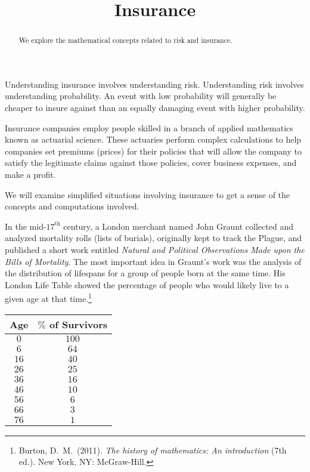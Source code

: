 \documentclass{ximera}
\title{Insurance}
\begin{document}
\begin{abstract}
We explore the mathematical concepts related to risk and insurance.
\end{abstract}

\maketitle

Understanding insurance involves understanding risk. Understanding risk involves understanding probability. An event with low probability will generally be cheaper to insure against than an equally damaging event with higher probability.

Insurance companies employ people skilled in a branch of applied mathematics known as actuarial science. These actuaries perform complex calculations to help companies set premiums (prices) for their policies that will allow the company to satisfy the legitimate claims against those policies, cover business expenses, and make a profit.

We will examine simplified situations involving insurance to get a sense of the concepts and computations involved.

In the mid-$17^\text{th}$ century, a London merchant named John Graunt collected and analyzed mortality rolls (lists of burials), originally kept to track the Plague, and published a short work entitled \textit{Natural and Political Observations Made upon the Bills of Mortality}. The most important idea in Graunt's work was the analysis of the distribution of lifespans for a group of people born at the same time. His London Life Table showed the percentage of people who would likely live to a given age at that time.\footnote{Burton, D.\ M.\ (2011). \textit{The history of mathematics: An introduction} (7th ed.). New York, NY: McGraw-Hill.}
\begin{center}
\begin{tabular}{@{}cc@{}}\toprule
\textbf{Age} & \textbf{$\%$ of Survivors}\\\midrule
$0$ & $100$\\
$6$ & $64$\\
$16$ & $40$\\
$26$ & $25$\\
$36$ & $16$\\
$46$ & $10$\\
$56$ & $6$\\
$66$ & $3$\\
$76$ & $1$\\\bottomrule
\end{tabular}
\end{center}
\end{document}
